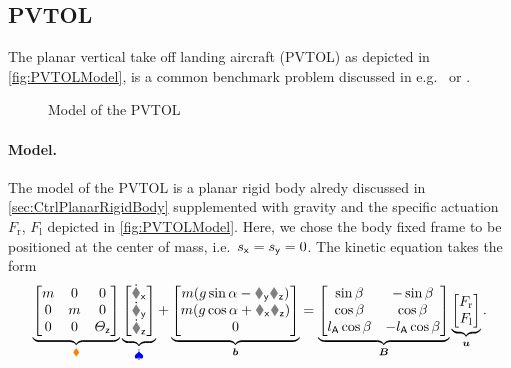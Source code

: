 \subsection{PVTOL}\label{sec:CtrlExamplePVTOL}
The planar vertical take off landing aircraft (PVTOL) as depicted in \autoref{fig:PVTOLModel}, is a common benchmark problem discussed in e.g.\ \cite{Hauser:PVTOL} or \cite{Fliess:LieBacklund}.
\begin{figure}
 \centering
 
 \caption{Model of the PVTOL}
 \label{fig:PVTOLModel}
\end{figure}

\paragraph{Model.}
The model of the PVTOL is a planar rigid body alredy discussed in \autoref{sec:CtrlPlanarRigidBody} supplemented with gravity and the specific actuation $F_\text{r}$, $F_\text{l}$ depicted in \autoref{fig:PVTOLModel}.
Here, we chose the body fixed frame to be positioned at the center of mass, i.e.\ $s_{\mathsf{x}} = s_{\mathsf{y}} = 0$.
The kinetic equation takes the form
\begin{align}
 \underbrace{\begin{bmatrix} \m & 0 & 0 \\ 0 & \m & 0 \\ 0 & 0 & \Jz \end{bmatrix}}_{\sysInertiaMat}
 \underbrace{\begin{bmatrix} \vxd \\ \vyd \\ \wzd \end{bmatrix}}_{\sysVeld}
 +
 \underbrace{\begin{bmatrix} m(\gravityAccConst \sin\tiltAngle - \vy \wz) \\ m (\gravityAccConst \cos\tiltAngle + \vx \wz) \\ 0 \end{bmatrix}}_{\sysForce}
 =
 \underbrace{\begin{bmatrix} \sin\beta & -\sin\beta \\ \cos\beta & \cos\beta \\ \ArmRadius \cos\beta & -\ArmRadius\cos\beta \end{bmatrix}}_{\sysInputMat}
 \underbrace{\begin{bmatrix} F_\text{r} \\ F_\text{l} \end{bmatrix}}_{\sysInput}
 .
\end{align}
